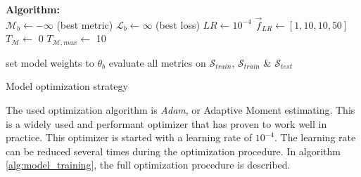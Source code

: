 \begin{algorithm}[H]
    \SetAlgoLined
    \textbf{Algorithm:} \\
    $\mathcal{M}_b \leftarrow -\infty $ (best metric)\;
    $\mathcal{L}_b \leftarrow \infty $ (best loss)\;
    $LR \leftarrow 10^{-4}$ \;
    $\vec{f}_{LR} \leftarrow \left[ 1, 10, 10, 50 \right] $ \;
    $T_{\mathcal{M}} \leftarrow$ 0 \;
    $T_{\mathcal{M}, max} \leftarrow $ 10 \;

   set model weights to $\theta_b$ \;
   evaluate all metrics on $\mathcal{S}_{train}$, $\mathcal{S}_{train}$ \& $\mathcal{S}_{test}$ \;
    
    \caption{Model optimization strategy\label{alg:model_training}}
\end{algorithm}

\par{
    The used optimization algorithm is \textit{Adam}, or Adaptive Moment estimating.
    This is a widely used and performant optimizer that has proven to work well in practice.
    This optimizer is started with a learning rate of $10^{-4}$.
    The learning rate can be reduced several times during the optimization procedure.
    In algorithm \ref{alg:model_training}, the full optimization procedure is described.
}